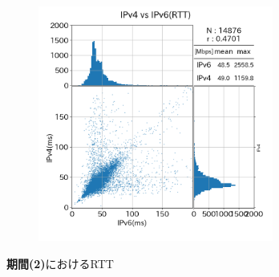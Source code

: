 \begin{figure}[htbp]
\begin{center}
\begin{minipage}[t]{0.48\textwidth}
\begin{subfigure}[b]{\textwidth}
                \label{new_CATV_rtt}
            \end{subfigure}
            \begin{subfigure}[b]{\textwidth}
                \centering
                \includegraphics[width=0.85\textwidth]{fig/new_Mobile_rtt.png}
                \label{new_Mobile_rtt}
            \end{subfigure}
            \caption{{\bf 期間(2)}におけるRTT}
            \label{fig:new_Line_rtt}
        \end{minipage}
    \end{center}
\end{figure}
\FloatBarrier

